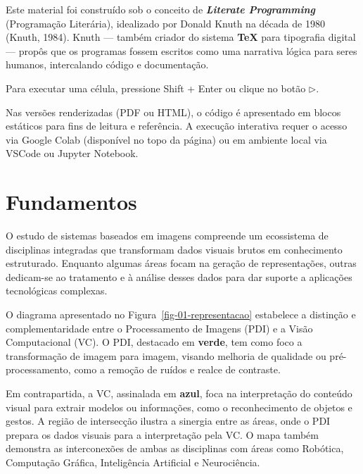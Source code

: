 \documentclass[
  portuguese,
  letterpaper,
  openany,
  oneside,
  12pt,
  a4paper]{book}
\begin{document}
Este material foi construído sob o conceito de \textbf{\emph{Literate
Programming}} (Programação Literária), idealizado por Donald Knuth na
década de 1980 (Knuth, 1984). Knuth --- também criador do sistema
\textbf{TeX} para tipografia digital --- propôs que os programas fossem
escritos como uma narrativa lógica para seres humanos, intercalando
código e documentação.

Para executar uma célula, pressione Shift + Enter ou clique no botão
$\triangleright$.

\begin{tcolorbox}[enhanced jigsaw, coltitle=black, colback=white, colbacktitle=quarto-callout-note-color!10!white, bottomtitle=1mm, left=2mm, opacityback=0, breakable, rightrule=.15mm, titlerule=0mm, toptitle=1mm, opacitybacktitle=0.6, title=\textcolor{quarto-callout-note-color}{\faInfo}\hspace{0.5em}{Nota sobre o formato}, colframe=quarto-callout-note-color-frame, arc=.35mm, bottomrule=.15mm, toprule=.15mm, leftrule=.75mm]

Nas versões renderizadas (PDF ou HTML), o código é apresentado em blocos
estáticos para fins de leitura e referência. A execução interativa
requer o acesso via Google Colab (disponível no topo da página) ou em
ambiente local via VSCode ou Jupyter Notebook.

\end{tcolorbox}

\section{Fundamentos}\label{fundamentos}

O estudo de sistemas baseados em imagens compreende um ecossistema de
disciplinas integradas que transformam dados visuais brutos em
conhecimento estruturado. Enquanto algumas áreas focam na geração de
representações, outras dedicam-se ao tratamento e à análise desses dados
para dar suporte a aplicações tecnológicas complexas.

O diagrama apresentado no Figura~\ref{fig-01-representacao} estabelece a
distinção e complementaridade entre o Processamento de Imagens (PDI) e a
Visão Computacional (VC). O PDI, destacado em \textbf{verde}, tem como
foco a transformação de imagem para imagem, visando melhoria de
qualidade ou pré-processamento, como a remoção de ruídos e realce de
contraste.

Em contrapartida, a VC, assinalada em \textbf{azul}, foca na
interpretação do conteúdo visual para extrair modelos ou informações,
como o reconhecimento de objetos e gestos. A região de intersecção
ilustra a sinergia entre as áreas, onde o PDI prepara os dados visuais
para a interpretação pela VC. O mapa também demonstra as interconexões
de ambas as disciplinas com áreas como Robótica, Computação Gráfica,
Inteligência Artificial e Neurociência.
\end{document}
